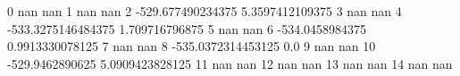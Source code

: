 0 nan nan
1 nan nan
2 -529.677490234375 5.3597412109375
3 nan nan
4 -533.3275146484375 1.709716796875
5 nan nan
6 -534.0458984375 0.9913330078125
7 nan nan
8 -535.0372314453125 0.0
9 nan nan
10 -529.9462890625 5.0909423828125
11 nan nan
12 nan nan
13 nan nan
14 nan nan
